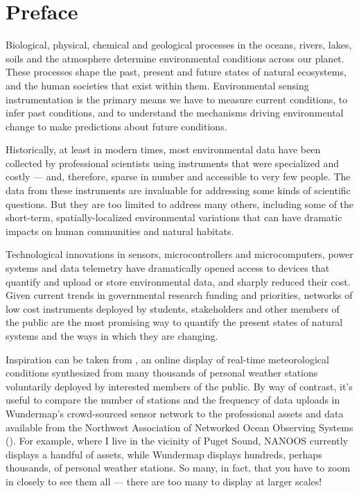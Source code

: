 \chapter*{Preface}

Biological, physical, chemical and geological processes in the oceans, rivers, lakes, soils and the atmosphere determine environmental conditions across our planet. 
These processes shape the past, present and future states of natural ecosystems, and the human societies that exist within them. 
Environmental sensing instrumentation is the primary means we have to measure current conditions, to infer past conditions, and to understand the mechanisms driving environmental change to make predictions about future conditions. 

Historically, at least in modern times, most environmental data have been collected by professional scientists using instruments that were specialized and costly --- and, therefore, sparse in number and accessible to very few people.
The data from these instruments are invaluable for addressing some kinds of scientific questions. 
But they are too limited to address many others, including some of the short-term, spatially-localized environmental variations that can have dramatic impacts on human communities and natural habitats.

Technological innovations in sensors, microcontrollers and microcomputers, power systems and data telemetry have dramatically opened access to devices that quantify and upload or store environmental data, and sharply reduced their cost.
Given current trends in governmental research funding and priorities, networks of low cost instruments deployed by students, stakeholders and other members of the public are the most promising way to quantify the present states of natural systems and the ways in which they are changing. 

Inspiration can be taken from , an online display of real-time meteorological conditions synthesized from many thousands of personal weather stations voluntarily deployed by interested members of the public. 
By way of contrast, it's useful to compare the number of stations and the frequency of data uploads in Wundermap's crowd-sourced sensor network to the professional assets and data available from the Northwest Association of Networked Ocean Observing Systems (). 
For example, where I live in the vicinity of Puget Sound, NANOOS currently displays a handful of assets, while Wundermap displays hundreds, perhaps thousands, of personal weather stations. 
So many, in fact, that you have to zoom in closely to see them all --- there are too many to display at larger scales!

